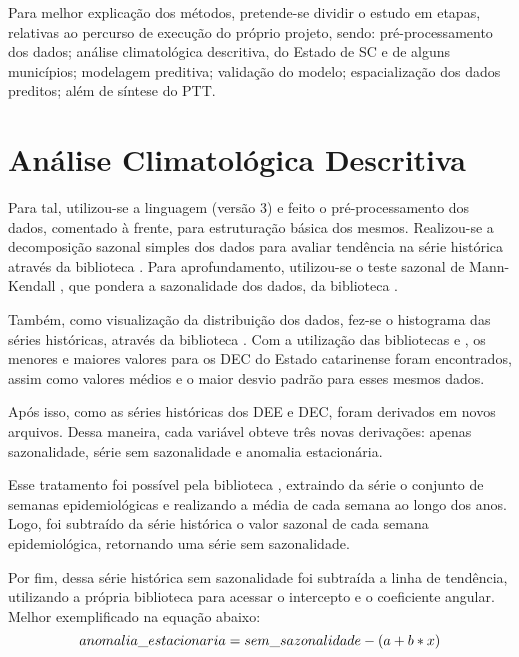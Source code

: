 \indent Para melhor explicação dos métodos, pretende-se dividir o estudo em etapas, relativas ao percurso de execução do próprio projeto, sendo: pré-processamento dos dados; análise climatológica descritiva, do Estado de \acrlong{SC} e de alguns municípios; modelagem preditiva; validação do modelo; espacialização dos dados preditos; além de síntese do \acrfull{PTT}.

\section{Análise Climatológica Descritiva}

\indent Para tal, utilizou-se a linguagem  (versão 3) \cite{python3_2009_van} e feito o pré-processamento dos dados, comentado à frente, para estruturação básica dos mesmos. Realizou-se a decomposição sazonal simples dos dados para avaliar tendência na série histórica através da biblioteca  \cite{statsmodels_2010_seabold}. Para aprofundamento, utilizou-se o teste sazonal de Mann-Kendall , que pondera a sazonalidade dos dados, da biblioteca  \cite{pyMannKendall_2019_Hussain}.

\indent Também, como visualização da distribuição dos dados, fez-se o histograma das séries históricas, através da biblioteca  \cite{matplotlib_2007_hunter}. Com a utilização das bibliotecas  \cite{pandas_2010_scipy, pandas_2020_reback} e  \cite{numpy_2020_harrisarray}, os menores e maiores valores para os \acrshort{DEC} do Estado catarinense foram encontrados, assim como valores médios e o maior desvio padrão para esses mesmos dados.

\indent Após isso, como as séries históricas dos \acrshort{DEE} e \acrshort{DEC}, foram derivados em novos arquivos. Dessa maneira, cada variável obteve três novas derivações: apenas sazonalidade, série sem sazonalidade e anomalia estacionária. 

\indent Esse tratamento foi possível pela biblioteca , extraindo da série o conjunto de semanas epidemiológicas e realizando a média de cada semana ao longo dos anos. Logo, foi subtraído da série histórica o valor sazonal de cada semana epidemiológica, retornando uma série sem sazonalidade.

\indent Por fim, dessa série histórica sem sazonalidade foi subtraída a linha de tendência, utilizando a própria biblioteca   para acessar o intercepto e o coeficiente angular. Melhor exemplificado na equação abaixo:
\begin{equation}
\centering anomalia\_estacionaria = sem\_sazonalidade - ( a + b * x )  
\end{equation}

